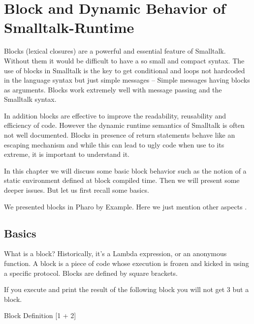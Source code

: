 \documentclass[a4paper,10pt,twoside]{book}
\begin{document}
\fi
\sloppy
\chapter{Block and Dynamic Behavior of Smalltalk-Runtime}



Blocks (lexical closures) are a powerful and essential feature of Smalltalk. Without them it
would be difficult to have a so small and compact syntax. The use of blocks in Smalltalk
is the key to get conditional and loops not hardcoded in the language syntax but just 
simple messages -- Simple messages having blocks as arguments. Blocks work extremely well with message passing and the Smalltalk syntax. 

In addition blocks are  effective to improve the readability, reusability and efficiency of code. 
However the dynamic runtime semantics of Smalltalk is often not well documented. Blocks in presence of
return statements behave like an escaping mechanism and while this can lead to ugly code when use to its extreme, it is important to understand it. 

In this chapter we will discuss some basic block behavior such as the notion of a static environment 
defined at block compiled time. Then we will present some deeper issues. But let us first recall some basics.


We presented blocks in Pharo by Example. Here we just mention other aspects . 

\section{Basics}
What is a block? Historically, it's a Lambda expression, or an anonymous function. A block is a piece of code whose execution is frozen and kicked in using a specific protocol.  Blocks are defined by square brackets. 

If you execute and print the result of the following block you will not get 3 but a block. 
\begin{code}{Block Definition}
[1 + 2]
\end{code}
\end{document}
